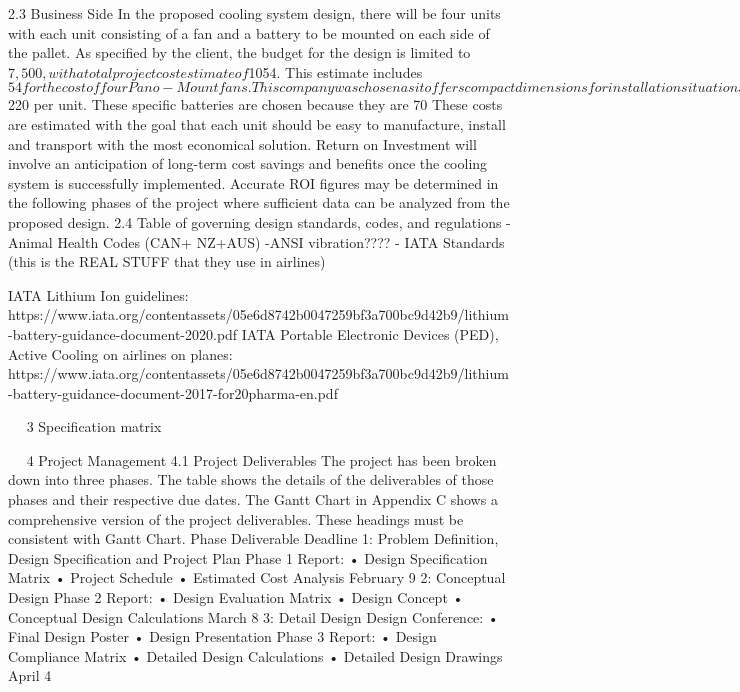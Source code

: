 2.3	Business Side
In the proposed cooling system design, there will be four units with each unit consisting of a fan and a battery to be mounted on each side of the pallet.
As specified by the client, the budget for the design is limited to $7,500, with a total project cost estimate of $1054. This estimate includes $54 for the cost of four Pano-Mount fans. This company was chosen as it offers compact dimensions for installation situations and has high durability which is important for the design of the ventilation system. The estimate also includes the cost of Ionic lithium 12V 20Ah batteries at $220 per unit. These specific batteries are chosen because they are 70%
These costs are estimated with the goal that each unit should be easy to manufacture, install and transport with the most economical solution. Return on Investment will involve an anticipation of long-term cost savings and benefits once the cooling system is successfully implemented. Accurate ROI figures may be determined in the following phases of the project where sufficient data can be analyzed from the proposed design.
2.4	Table of governing design standards, codes, and regulations
-Animal Health Codes (CAN+ NZ+AUS)
-ANSI vibration????
- IATA Standards (this is the REAL STUFF that they use in airlines)

IATA Lithium Ion guidelines:
https://www.iata.org/contentassets/05e6d8742b0047259bf3a700bc9d42b9/lithium-battery-guidance-document-2020.pdf
IATA Portable Electronic Devices (PED), Active Cooling on airlines on planes:
https://www.iata.org/contentassets/05e6d8742b0047259bf3a700bc9d42b9/lithium-battery-guidance-document-2017-for20pharma-en.pdf


 
3	Specification matrix

 
4	Project Management
4.1	Project Deliverables
The project has been broken down into three phases. The table shows the details of the deliverables of those phases and their respective due dates. The Gantt Chart in Appendix C shows a comprehensive version of the project deliverables. These headings must be consistent with Gantt Chart.
Phase	Deliverable	Deadline
1: Problem Definition, Design Specification and Project Plan	Phase 1 Report:
•	Design Specification Matrix
•	Project Schedule
•	Estimated Cost Analysis	February 9
2: Conceptual Design	Phase 2 Report:
•	Design Evaluation Matrix
•	Design Concept
•	Conceptual Design Calculations	March 8
3: Detail Design	Design Conference:
•	Final Design Poster
•	Design Presentation
Phase 3 Report:
•	Design Compliance Matrix
•	Detailed Design Calculations
•	Detailed Design Drawings	April 4


